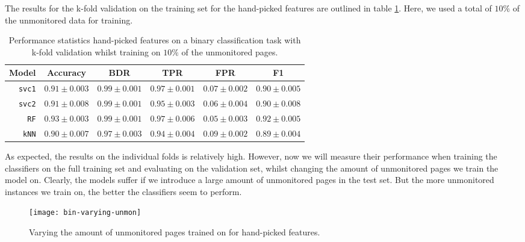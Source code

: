The results for the k-fold validation on the training set for the hand-picked features are outlined in table \ref{table:hand-picked-bin}.
Here, we used a total of $10\%$ of the unmonitored data for training.

\begin{table}[ht]
  \centering
  \begin{tabular}{ r  r  r  r  r  r } \hline
    \multicolumn{1}{c}{\textbf{Model}} & \multicolumn{1}{c}{\textbf{Accuracy}} & \multicolumn{1}{c}{\textbf{BDR}} & \multicolumn{1}{c}{\textbf{TPR}} &
      \multicolumn{1}{c}{\textbf{FPR}} & \multicolumn{1}{c}{\textbf{F1}} \\ \hline

    \texttt{svc1} & $0.91 \pm 0.003$ & $0.99 \pm 0.001$ & $0.97 \pm 0.001$ & $0.07 \pm 0.002$ & $0.90 \pm 0.005$ \\

    \texttt{svc2} & $0.91 \pm 0.008$ & $0.99 \pm 0.001$ & $0.95 \pm 0.003$ & $0.06 \pm 0.004$ & $0.90 \pm 0.008$ \\

    \texttt{RF} & $0.93 \pm 0.003$ & $0.99 \pm 0.001$ & $0.97 \pm 0.006$ & $0.05 \pm 0.003$ & $0.92 \pm 0.005$ \\

    \texttt{kNN} & $0.90 \pm 0.007$ & $0.97 \pm 0.003$ & $0.94 \pm 0.004$ & $0.09 \pm 0.002$ & $0.89 \pm 0.004$ \\

    \hline
  \end{tabular}
  \caption{Performance statistics hand-picked features on a binary classification task with k-fold validation whilst training on $10\%$ of the unmonitored pages.}
  \label{table:hand-picked-bin}
\end{table}

As expected, the results on the individual folds is relatively high.
However, now we will measure their performance when training the classifiers on the full training set and evaluating on the validation set, whilst changing the amount of unmonitored pages we train the model on.
Clearly, the models suffer if we introduce a large amount of unmonitored pages in the test set.
But the more unmonitored instances we train on, the better the classifiers seem to perform.

\begin{figure}[ht]
  \centering
  \texttt{[image: bin-varying-unmon]}
  \caption{Varying the amount of unmonitored pages trained on for hand-picked features.}
  \label{fig:bin-varying-unmon}
\end{figure}

